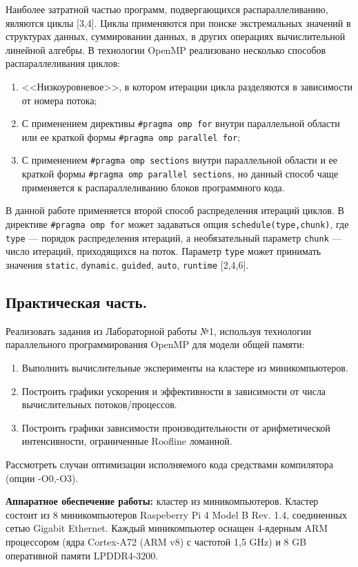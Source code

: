 Наиболее затратной частью программ, подвергающихся распараллеливанию, являются циклы [3,4]. Циклы применяются при поиске экстремальных значений в структурах данных, суммировании данных, в других операциях вычислительной линейной алгебры.
В технологии OpenMP реализовано несколько способов распараллеливания циклов: 
\begin{enumerate}
    \item <<Низкоуровневое>>, в котором итерации цикла разделяются в зависимости от номера потока; 
    \item С применением директивы \verb|#pragma omp for| внутри параллельной области или ее краткой формы \verb|#pragma omp parallel for|; 
    \item С применением \verb|#pragma omp sections| внутри параллельной области и ее краткой формы \verb|#pragma omp parallel sections|, но данный способ чаще применяется к распараллеливанию блоков программного кода. 
\end{enumerate}
В данной работе применяется второй способ распределения итераций циклов. В директиве \verb|#pragma omp for| может задаваться опция \verb|schedule(type,chunk)|, где \verb|type| --- порядок распределения итераций, а необязательный параметр \verb|chunk| --- число итераций, приходящихся на поток. Параметр \verb|type| может принимать значения \verb|static|, \verb|dynamic|, \verb|guided|, \verb|auto|, \verb|runtime| [2,4,6]. 

\subsection*{Практическая часть.}
Реализовать задания из Лабораторной работы №1, используя технологии параллельного программирования OpenMP для модели общей памяти:
\begin{enumerate}
\item Выполнить вычислительные эксперименты на кластере из миникомпьютеров.
\item Построить графики ускорения и эффективности в зависимости от числа вычислительных потоков/процессов. 
\item Построить графики зависимости производительности от арифметической интенсивности, ограниченные Roofline ломанной. 
\end{enumerate}
Рассмотреть случаи оптимизации исполняемого кода средствами компилятора (опции -O0,-O3).

\textbf{Аппаратное обеспечение работы:} кластер из миникомпьютеров.
Кластер состоит из 8 миникомпьютеров Raspeberry Pi 4 Model B Rev. 1.4, соединенных сетью Gigabit Ethernet. Каждый миникомпьютер оснащен 4-ядерным ARM процессором (ядра Cortex-A72 (ARM v8) с частотой 1,5 GHz) и 8 GB оперативной памяти LPDDR4-3200.

